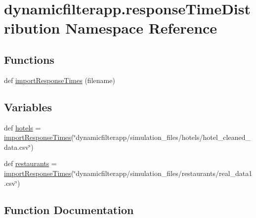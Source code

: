 \hypertarget{namespacedynamicfilterapp_1_1response_time_distribution}{}\section{dynamicfilterapp.\+response\+Time\+Distribution Namespace Reference}
\label{namespacedynamicfilterapp_1_1response_time_distribution}
\subsection*{Functions}
\begin{DoxyCompactItemize}
\item 
def \mbox{\hyperlink{namespacedynamicfilterapp_1_1response_time_distribution_a99f5f079f782c55c2ecf267693ff59f4}{import\+Response\+Times}} (filename)
\end{DoxyCompactItemize}
\subsection*{Variables}
\begin{DoxyCompactItemize}
\item 
def \mbox{\hyperlink{namespacedynamicfilterapp_1_1response_time_distribution_a5dc6ecb2720239630808a8ab06ab1840}{hotels}} = \mbox{\hyperlink{namespacedynamicfilterapp_1_1response_time_distribution_a99f5f079f782c55c2ecf267693ff59f4}{import\+Response\+Times}}(\char`\"{}dynamicfilterapp/simulation\+\_\+files/hotels/hotel\+\_\+cleaned\+\_\+data.\+csv\char`\"{})
\item 
def \mbox{\hyperlink{namespacedynamicfilterapp_1_1response_time_distribution_a6caf9f682a37695b1f6baf64018c2994}{restaurants}} = \mbox{\hyperlink{namespacedynamicfilterapp_1_1response_time_distribution_a99f5f079f782c55c2ecf267693ff59f4}{import\+Response\+Times}}(\char`\"{}dynamicfilterapp/simulation\+\_\+files/restaurants/real\+\_\+data1.\+csv\char`\"{})
\end{DoxyCompactItemize}


\subsection{Function Documentation}
\mbox{\label{namespacedynamicfilterapp_1_1response_time_distribution_a99f5f079f782c55c2ecf267693ff59f4}} 
